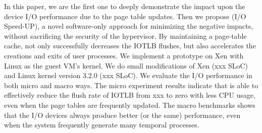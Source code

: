\documentclass[letterpaper,twocolumn,10pt]{article}
\begin{document}
In this paper, we are the first one to deeply demonstrate the impact upon the device I/O performance due to the page table updates. Then we propose \name (I/O Speed-UP), a novel software-only approach for minimizing the negative impacts, without sacrificing the security of the hypervisor.
By maintaining a page-table cache, \name not only successfully decreases the IOTLB flushes, but also accelerates the creations and exits of user processes.
We implement a prototype on Xen with Linux as the guest VM's kernel. We do small modifications of Xen (xxx SLoC) and Linux kernel version 3.2.0 (xxx SLoC). We evaluate the I/O performance in both micro and macro ways. The micro experiment results indicate that \name is able to effectively reduce the flush rate of IOTLB from xxx to zero with less CPU usage, even when the page tables are frequently updated. The macro benchmarks shows that the I/O devices always produce better (or the same) performance, even when the system frequently generate many temporal processes.






%


%

%
%






{


}
\end{document}
